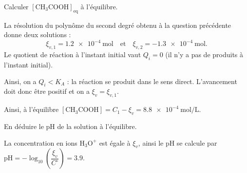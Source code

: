 \begin{enonce}
Calculer $\mathrm{[CH_3COOH]}_\text{eq}$ à l'équilibre.
\end{enonce}


\begin{corrige}
La résolution du polynôme du second degré obtenu à la question précédente donne deux solutions : 
\[
\xi_{v,1}= \SI{1,2e-4}{\mole}
\quad\text{et}\quad
\xi_{v,2}=\SI{-1,3e-4}{\mole}.
\]
Le quotient de réaction à l'instant initial vaut $Q_i=0$ (il n'y a pas de produits à l'instant initial). 

Ainsi, on a $Q_i<K_A$ : la réaction se produit dans le sens direct. L'avancement doit donc être positif et on a $\xi_v=\xi_{v,1}$.

Ainsi, à l'équilibre $[\text{CH}_3\text{COOH}]=C_1-\xi_{v}=\SI{8.8e-4}{\mole\per\liter}$.
\end{corrige}




\begin{enonce}
En déduire le pH de la solution à l'équilibre.
\end{enonce}


\begin{corrige}
La concentration en ions $\text{H}_3\text{O}^+$ est égale à $\xi_v$, ainsi le pH se calcule par $\text{pH}=-\log_{10}\left(\dfrac{\xi_v}{C^\circ}\right)=\num{3.9}$.
\end{corrige}


\finEntrainement






\afficheReponsesMelangees

\finFicheEntrainement                                                                        %


\ifdefined\mainIsLoaded\else
\printReponsesEtCorriges
\fi
